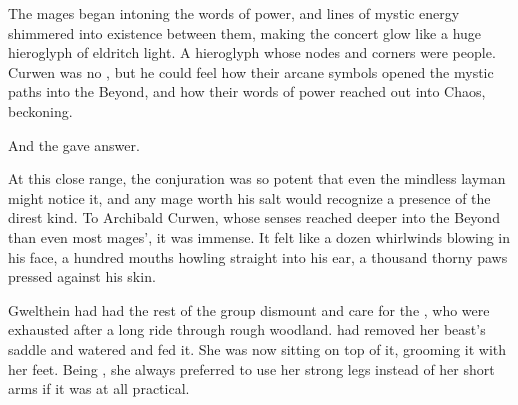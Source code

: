 The mages began intoning the \draconic{} words of power, and lines of mystic energy shimmered into existence between them, making the concert glow like a huge hieroglyph of eldritch light. 
A hieroglyph whose nodes and corners were people. 
Curwen was no \rethyax, but he could feel how their arcane symbols opened the mystic paths into the Beyond, and how their words of power reached out into Chaos, beckoning. 

And the \daemons{} gave answer. 


At this close range, the conjuration was so potent that even the mindless layman might notice it, and any mage worth his salt would recognize a \daemonic{} presence of the direst kind. 
To Archibald Curwen, whose senses reached deeper into the Beyond than even most mages', it was immense. 
It felt like a dozen whirlwinds blowing in his face, a hundred mouths howling straight into his ear, a thousand thorny paws pressed against his skin. 








\begin{comment}
\subsection{\Tsekkect{} and Delph}
\end{comment}
\new
Gwelthein had had the rest of the group dismount and care for the \relcs, who were exhausted after a long ride through rough woodland. 
\Tsekkect{} had removed her beast's saddle and watered and fed it. 
She was now sitting on top of it, grooming it with her feet. 
Being \meccaran{}, she always preferred to use her strong legs instead of her short arms if it was at all practical. 

